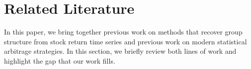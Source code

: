 \section{Related Literature}\label{sec:lit}
In this paper, we bring together previous work on methods that recover group structure from stock return time series and previous work on modern statistical arbitrage strategies. In this section, we briefly review both lines of work and highlight the gap that our work fills.

